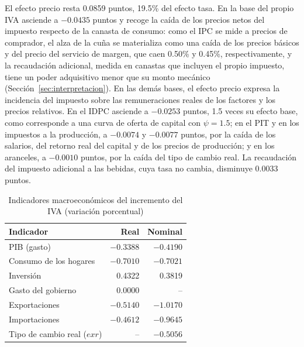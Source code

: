 \documentclass[11pt]{article}
\begin{document}
El efecto precio resta 0.0859 puntos, 19.5\% del efecto tasa. En la base del propio IVA asciende a $-0.0435$ puntos y recoge la caída de los precios netos del impuesto respecto de la canasta de consumo: como el IPC se mide a precios de comprador, el alza de la cuña se materializa como una caída de los precios básicos y del precio del servicio de margen, que caen 0.50\% y 0.45\%, respectivamente, y la recaudación adicional, medida en canastas que incluyen el propio impuesto, tiene un poder adquisitivo menor que su monto mecánico (Sección~\ref{sec:interpretacion}). En las demás bases, el efecto precio expresa la incidencia del impuesto sobre las remuneraciones reales de los factores y los precios relativos. En el IDPC asciende a $-0.0253$ puntos, 1.5 veces su efecto base, como corresponde a una curva de oferta de capital con $\psi=1.5$; en el PIT y en los impuestos a la producción, a $-0.0074$ y $-0.0077$ puntos, por la caída de los salarios, del retorno real del capital y de los precios de producción; y en los aranceles, a $-0.0010$ puntos, por la caída del tipo de cambio real. La recaudación del impuesto adicional a las bebidas, cuya tasa no cambia, disminuye 0.0033 puntos.

\begin{table}[H]
\centering
\caption{Indicadores macroeconómicos del incremento del IVA (variación porcentual)}
\begin{tabular}{|l|r|r|}
  \hline
  Indicador & Real & Nominal \\
  \hline
  PIB (gasto) & $-0.3388$ & $-0.4190$ \\
  \hline
  Consumo de los hogares & $-0.7010$ & $-0.7021$ \\
  \hline
  Inversión & 0.4322 & 0.3819 \\
  \hline
  Gasto del gobierno & 0.0000 & -- \\
  \hline
  Exportaciones & $-0.5140$ & $-1.0170$ \\
  \hline
  Importaciones & $-0.4612$ & $-0.9645$ \\
  \hline
  Tipo de cambio real ($exr$) & -- & $-0.5056$ \\
  \hline
\end{tabular}
\end{table}
\end{document}
